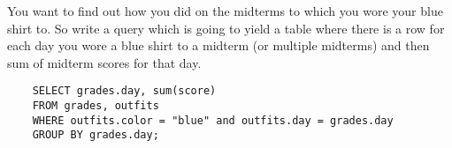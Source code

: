 You want to find out how you did on the midterms to which you wore your blue shirt to. So write a query which is going to yield a table where there is a row for each day you wore a blue shirt to a midterm (or multiple midterms) and then sum of midterm scores for that day. 

\begin{solution}[0.7in]
\begin{lstlisting}
    SELECT grades.day, sum(score) 
    FROM grades, outfits 
    WHERE outfits.color = "blue" and outfits.day = grades.day 
    GROUP BY grades.day;
\end{lstlisting}
\end{solution}